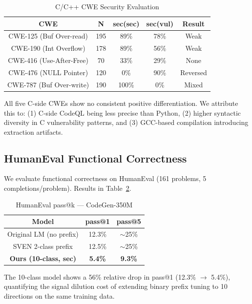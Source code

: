 \documentclass[conference]{IEEEtran}
\begin{document}
\begin{table}[h]
\centering
\caption{C/C++ CWE Security Evaluation}
\label{tab:c_sec}
\begin{tabular}{c|c|c|c|c}
\toprule
\textbf{CWE} & \textbf{N} & \textbf{sec(sec)} & \textbf{sec(vul)} & \textbf{Result} \\
\midrule
CWE-125 (Buf Over-read) & 195 & 89\% & 78\% & Weak \\
CWE-190 (Int Overflow) & 178 & 89\% & 56\% & Weak \\
CWE-416 (Use-After-Free) & 70 & 33\% & 29\% & None \\
CWE-476 (NULL Pointer) & 120 & 0\% & 90\% & Reversed \\
CWE-787 (Buf Over-write) & 190 & 100\% & 0\% & Mixed \\
\bottomrule
\end{tabular}
\end{table}

All five C-side CWEs show no consistent positive differentiation. We attribute this to: (1) C-side CodeQL being less precise than Python, (2) higher syntactic diversity in C vulnerability patterns, and (3) GCC-based compilation introducing extraction artifacts.

\subsection{HumanEval Functional Correctness}

We evaluate functional correctness on HumanEval (161 problems, 5 completions/problem). Results in Table~\ref{tab:humaneval}.

\begin{table}[h]
\centering
\caption{HumanEval pass@k — CodeGen-350M}
\label{tab:humaneval}
\begin{tabular}{c|c|c}
\toprule
\textbf{Model} & \textbf{pass@1} & \textbf{pass@5} \\
\midrule
Original LM (no prefix) & 12.3\% & $\sim$25\% \\
SVEN 2-class prefix & 12.5\% & $\sim$25\% \\
\textbf{Ours (10-class, sec)} & \textbf{5.4\%} & \textbf{9.3\%} \\
\bottomrule
\end{tabular}
\end{table}

The 10-class model shows a 56\% relative drop in pass@1 (12.3\% $\rightarrow$ 5.4\%), quantifying the signal dilution cost of extending binary prefix tuning to 10 directions on the same training data.
\end{document}
